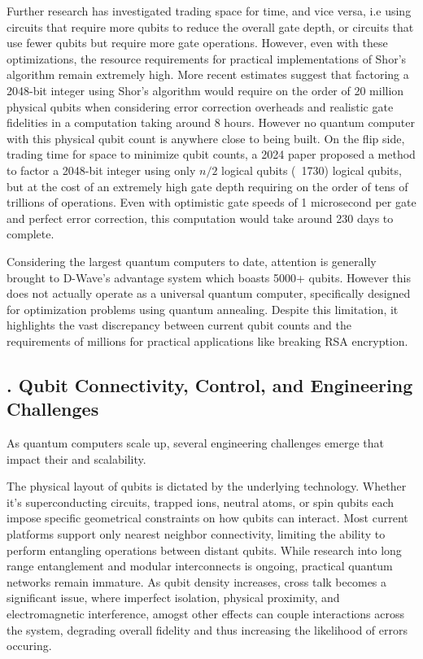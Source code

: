 \documentclass{elbioimp2}
\begin{document}
Further research has investigated trading space for time, and vice versa, i.e using circuits that require more qubits to reduce the overall gate depth, or circuits that use fewer qubits but require more gate operations. However, even with these optimizations, the resource requirements for practical implementations of Shor's algorithm remain extremely high. More recent estimates suggest that factoring a 2048-bit integer using Shor's algorithm would require on the order of 20 million physical qubits when considering error correction overheads and realistic gate fidelities in a computation taking around 8 hours\cite{Gidney_2021}. However no quantum computer with this physical qubit count is anywhere close to being built. On the flip side, trading time for space to minimize qubit counts, a 2024 paper proposed a method to factor a 2048-bit integer using only $n/2$ logical qubits (~1730) logical qubits, but at the cost of an extremely high gate depth requiring on the order of tens of trillions of operations\cite{10.1007/978-3-032-01878-6_13}. Even with optimistic gate speeds of 1 microsecond per gate and perfect error correction, this computation would take around 230 days to complete.

Considering the largest quantum computers to date, attention is generally brought to D-Wave's advantage system which boasts 5000+ qubits\cite{NatureQC2023}. However this does not actually operate as a universal quantum computer, specifically designed for optimization problems using quantum annealing. Despite this limitation, it highlights the vast discrepancy between current qubit counts and the requirements of millions for practical applications like breaking RSA encryption.


\subsection{. Qubit Connectivity, Control, and Engineering Challenges}

As quantum computers scale up, several engineering challenges emerge that impact their and scalability.

The physical layout of qubits is dictated by the underlying technology. Whether it's superconducting circuits, trapped ions, neutral atoms, or spin qubits each impose specific geometrical constraints on how qubits can interact. Most current platforms support only nearest neighbor connectivity, limiting the ability to perform entangling operations between distant qubits. While research into long range entanglement and modular interconnects is ongoing, practical quantum networks remain immature. As qubit density increases, cross talk becomes a significant issue, where imperfect isolation, physical proximity, and electromagnetic interference, amogst other effects can couple interactions across the system, degrading overall fidelity and thus increasing the likelihood of errors occuring.
\end{document}
